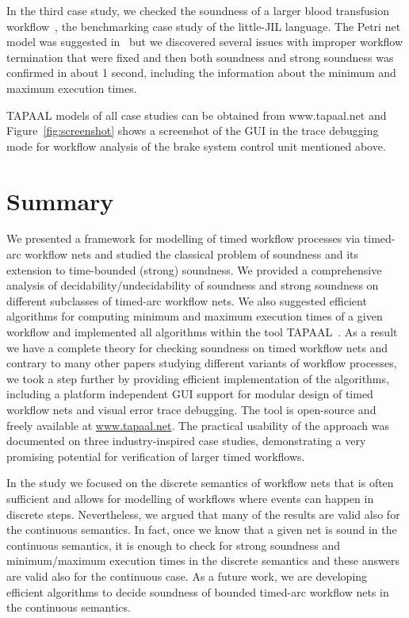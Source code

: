 In the third case study, we checked the soundness 
of a larger blood transfusion workflow~\cite{blood-benchmark},
the benchmarking case study of the little-JIL language. 
The Petri net model was suggested in~\cite{BLS:FHIES:12} but we discovered 
several issues with improper workflow termination that were fixed
and then both soundness and strong soundness was confirmed
in about 1 second, including the information about the minimum 
and maximum execution times. 

TAPAAL models of all case studies can be obtained from www.tapaal.net
and Figure~\ref{fig:screenshot} shows a screenshot of the GUI in the
trace debugging mode for workflow analysis of the brake system control 
unit mentioned above.

\section{Summary}\label{sumWorkflow}

We presented a framework for modelling of timed workflow processes
via timed-arc workflow nets and studied the classical problem of
soundness and its extension to time-bounded (strong) soundness.
We provided a comprehensive analysis of decidability/undecidability
of soundness and strong soundness on different subclasses of timed-arc
workflow nets. We also suggested efficient algorithms for computing
minimum and maximum execution times of a given workflow and implemented
all algorithms within the tool TAPAAL~\cite{DJJJMS:TACAS:12}. 
As a result we have a complete theory for checking soundness on
timed workflow nets and contrary to many other papers studying
different variants of workflow processes, we took a step further
by providing efficient implementation of the algorithms, including
a platform independent GUI support for modular design of timed
workflow nets and visual error trace debugging. The tool is open-source
and freely available at \url{www.tapaal.net}.
The practical usability of 
the approach was documented on three industry-inspired case studies,
demonstrating a very promising potential for verification of larger
timed workflows.

In the study we focused on the discrete semantics 
of workflow nets that is often sufficient and allows for modelling
of workflows where events can happen in discrete steps.
Nevertheless, we argued that many of the results
are valid also for the continuous semantics. In fact, once we
know that a given net is sound in the continuous semantics,
it is enough to check for strong soundness and minimum/maximum
execution times in the discrete semantics and these answers
are valid also for the continuous case. As a future work, we 
are developing efficient algorithms to decide soundness 
of bounded timed-arc workflow nets in the continuous semantics.
